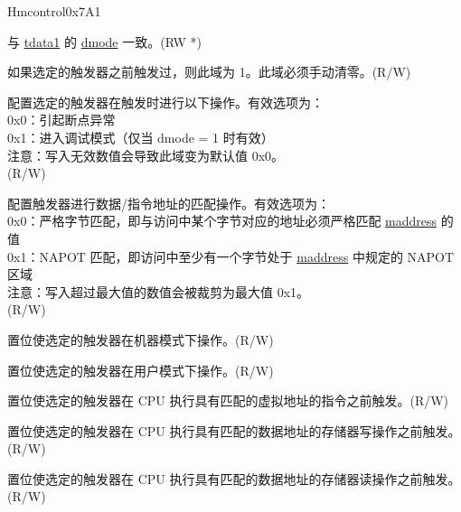 \begin{register}{H}{mcontrol}{0x7A1}\label{regdesc:MCONTROL}
%
%
%
%
%
%
%
%
%
%
%
%
%
%
\regnewline%
\begin{regdesc}\begin{reglist}
\label{fielddesc:MCONTROLDMODE}\item [dmode] 与 \hyperref[regdesc:TDATA1]{tdata1} 的 \hyperref[fielddesc:TDATA1DMODE]{dmode} 一致。(RW *)
\label{fielddesc:MCONTROLHIT}\item [hit] 如果选定的触发器之前触发过，则此域为 1。此域必须手动清零。(R/W)
\label{fielddesc:MCONTROLACTION}\item [action] 配置选定的触发器在触发时进行以下操作。有效选项为：\\
0x0：引起断点异常\\
0x1：进入调试模式（仅当 dmode = 1 时有效）\\
注意：写入无效数值会导致此域变为默认值 0x0。\\
(R/W)
\label{fielddesc:MCONTROLMATCH}\item [match] 配置触发器进行数据/指令地址的匹配操作。有效选项为：\\
0x0：严格字节匹配，即与访问中某个字节对应的地址必须严格匹配 \hyperref[regdesc:MADDRESS]{maddress} 的值\\
0x1：NAPOT 匹配，即访问中至少有一个字节处于  \hyperref[regdesc:MADDRESS]{maddress} 中规定的 NAPOT 区域\\
注意：写入超过最大值的数值会被裁剪为最大值 0x1。\\
(R/W)
\label{fielddesc:MCONTROLM}\item [m] 置位使选定的触发器在机器模式下操作。(R/W)
\label{fielddesc:MCONTROLU}\item [u] 置位使选定的触发器在用户模式下操作。(R/W)
\label{fielddesc:MCONTROLEXECUTE}\item [execute] 置位使选定的触发器在 CPU 执行具有匹配的虚拟地址的指令之前触发。(R/W)
\label{fielddesc:MCONTROLSTORE}\item [store] 置位使选定的触发器在 CPU 执行具有匹配的数据地址的存储器写操作之前触发。(R/W)
\label{fielddesc:MCONTROLLOAD}\item [load] 置位使选定的触发器在 CPU 执行具有匹配的数据地址的存储器读操作之前触发。(R/W)
\end{reglist}\end{regdesc}
\end{register}

